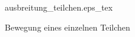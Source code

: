\begin{figure}
\centering
\def\svgwidth{0.4\columnwidth}
{ausbreitung_teilchen.eps_tex}
\caption{Bewegung eines einzelnen Teilchen \label{buch:papers:Wirbelringe:fig:ausbreitung_teilchen}}
\end{figure}